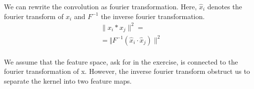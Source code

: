 We can rewrite the convolution as fourier transformation.
Here, $\hat x_i $ denotes the fourier transform of $x_i$ and $F^{-1}$ the inverse
fourier transformation.
\begin{align}
    & \lVert x_i * x_j \rVert ^ 2 = \\
    &    = \Vert F^{-1}(\hat x_i \cdot  \hat x_j) \rVert ^ 2  \\
\end{align}

We assume that the feature space, ask for in the exercise, is connected to the
fourier transformation of x. However, the inverse fourier transform obstruct
us to separate the kernel into two feature maps.

